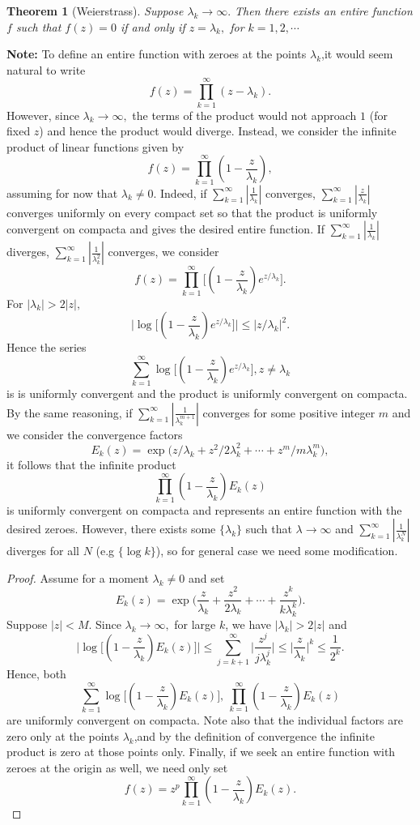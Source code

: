 \documentclass{book}
\newtheorem{thm}[defi]{Theorem}
\numberwithin{equation}{section}
\begin{document}
\begin{thm}[Weierstrass]
Suppose $\lambda_k \rightarrow \infty.$ Then there exists an entire function $f$ such that $f(z)=0$ if and only if $z=\lambda_k,$ for $k=1,2,\cdots$
\end{thm}

\textbf{Note:}
 To define an entire function with zeroes at the points $\lambda_k$,it would seem natural to write
 $$
 f(z)=\prod_{k=1}^\infty (z-\lambda_k).
 $$ However, since $\lambda_k \rightarrow \infty,$ the terms of the product would not approach $1$ (for fixed $z$) and hence the product would diverge. Instead, we consider the inﬁnite product of linear functions given by 
 $$
 f(z)=\prod_{k=1}^\infty (1-\frac{z}{\lambda_k}),
 $$ assuming for now that $\lambda_k \neq 0$. Indeed, if $\sum_{k=1}^\infty |\frac{1}{\lambda_k}|$ converges,	$\sum_{k=1}^\infty |\frac{z}{\lambda_k}|$ converges uniformly on every compact set so that the product is uniformly convergent on compacta and gives the desired entire function. If $\sum_{k=1}^\infty |\frac{1}{\lambda_k}|$ diverges, $\sum_{k=1}^\infty |\frac{1}{\lambda_k^2}|$ converges, we consider
 $$
 f(z)=\prod_{k=1}^\infty \bigg[(1-\frac{z}{\lambda_k})e^{z/\lambda_k}\bigg].
 $$ For $|\lambda_k|>2|z|,$
 $$
 \bigg| \log\bigg[(1-\frac{z}{\lambda_k})e^{z/\lambda_k}\bigg]\bigg| \leq |z/\lambda_k|^2. 
 $$ Hence the series
$$
\sum_{k=1}^\infty \log\bigg[(1-\frac{z}{\lambda_k})e^{z/\lambda_k}\bigg], z\neq \lambda_k
$$ is is uniformly convergent and the product is uniformly convergent on compacta. By the same reasoning, if $\sum_{k=1}^\infty |\frac{1}{\lambda_k^{m+1}}|$ converges for some positive integer $m$ and we consider the convergence factors
$$
E_k(z)=\exp{\bigg(z/\lambda_k+z^2/2\lambda_k^2+\cdots + z^m/m\lambda_k^m\bigg)},
$$ it follows that the inﬁnite product 
$$
\prod_{k=1}^\infty (1-\frac{z}{\lambda_k})E_k(z)
$$ is uniformly convergent on compacta and represents an entire function with the desired zeroes. However, there exists some $\{\lambda_k\}$ such that $\lambda \rightarrow \infty$ and $\sum_{k=1}^\infty |\frac{1}{\lambda_k^{N}}|$ diverges for all $N$ (e.g $\{\log k\}$), so for general case we need some modification.


\begin{proof}
Assume for a moment $\lambda_k \neq 0$ and set
$$
E_k(z)=\exp\bigg(\frac{z}{\lambda_k}+\frac{z^2}{2\lambda_k}+\cdots +\frac{z^k}{k\lambda_k^k}\bigg).
$$ Suppose $|z|<M.$ Since $\lambda_k \rightarrow \infty,$ for large $k$, we have $|\lambda_k|>2|z|$ and
$$
\bigg|\log\bigg[(1-\frac{z}{\lambda_k})E_k(z)\bigg]\bigg|\leq \sum_{j=k+1}^\infty \bigg| \frac{z^j}{j\lambda_k^j}\bigg|\leq \bigg|\frac{z}{\lambda_k}\bigg|^k \leq \frac{1}{2^k}.
$$ Hence, both
$$
\sum_{k=1}^\infty \log\bigg[(1-\frac{z}{\lambda_k})E_k(z)\bigg], \ \prod_{k=1}^\infty (1-\frac{z}{\lambda_k})E_k(z)
$$ are uniformly convergent on compacta. Note also that the individual factors are zero only at the points $\lambda_k$,and by the definition of convergence the inﬁnite product is zero at those points only. Finally, if we seek an entire function with zeroes at the origin as well, we need only set
$$
f(z)=z^p \prod_{k=1}^\infty (1-\frac{z}{\lambda_k})E_k(z).
$$
\end{proof}
\end{document}
